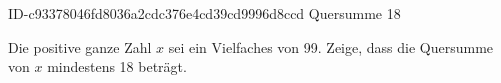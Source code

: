 \begin{exercise}
      {ID-c93378046fd8036a2cdc376e4cd39cd9996d8ccd}
      {Quersumme 18}
  \ifproblem\problem\par
    Die positive ganze Zahl $x$ sei ein Vielfaches von 99. Zeige, dass die
    Quersumme von $x$ mindestens 18 beträgt.
  \fi
\end{exercise}
